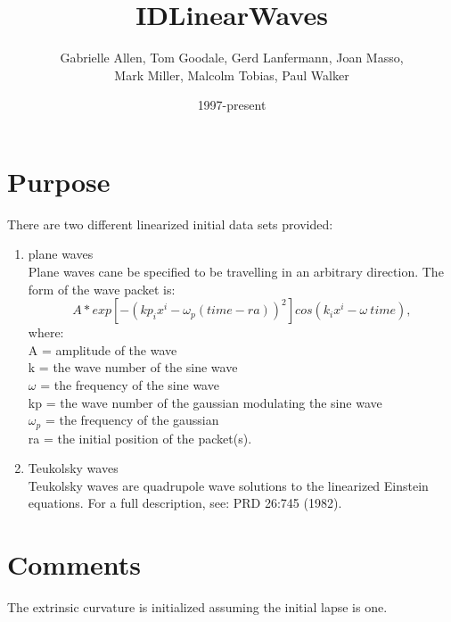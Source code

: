 \documentclass{article}
\begin{document}
\title{IDLinearWaves}
\author{Gabrielle Allen, Tom Goodale, Gerd Lanfermann, Joan Masso, \\
Mark Miller, Malcolm Tobias, Paul Walker}
\date{1997-present}
\maketitle


\section{Purpose}

There are two different linearized initial data sets provided:

\begin{enumerate}
\item	plane waves \\
Plane waves cane be specified to be travelling in an arbitrary direction.
The form of the wave packet is: 
\begin{equation}
 A*exp\left[-(kp_ix^i-\omega_p (time-ra))^2\right]
 cos(k_ix^i-\omega \ time),
\end{equation}
where:\\
A = amplitude of the wave  \\
k  = the wave number of the sine wave \\
$\omega$ = the frequency of the sine wave  \\
kp = the wave number of the gaussian modulating the sine wave \\
$\omega_p$ = the frequency of the gaussian \\
ra = the initial position of the packet(s). \\


\item	Teukolsky waves \\
Teukolsky waves are quadrupole wave solutions to the linearized
Einstein equations.  For a full description, see: PRD 26:745 (1982).


\end{enumerate}

\section{Comments}
The extrinsic curvature is initialized assuming the initial lapse is one.





\end{document}
